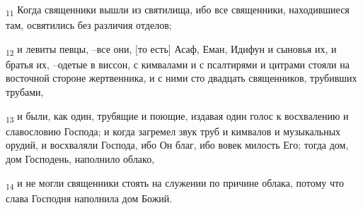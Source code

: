 \begin{tcolorbox}
\textsubscript{11} Когда священники вышли из святилища, ибо все священники, находившиеся там, освятились без различия отделов;
\end{tcolorbox}
\begin{tcolorbox}
\textsubscript{12} и левиты певцы, --все они, [то есть] Асаф, Еман, Идифун и сыновья их, и братья их, --одетые в виссон, с кимвалами и с псалтирями и цитрами стояли на восточной стороне жертвенника, и с ними сто двадцать священников, трубивших трубами,
\end{tcolorbox}
\begin{tcolorbox}
\textsubscript{13} и были, как один, трубящие и поющие, издавая один голос к восхвалению и славословию Господа; и когда загремел звук труб и кимвалов и музыкальных орудий, и восхваляли Господа, ибо Он благ, ибо вовек милость Его; тогда дом, дом Господень, наполнило облако,
\end{tcolorbox}
\begin{tcolorbox}
\textsubscript{14} и не могли священники стоять на служении по причине облака, потому что слава Господня наполнила дом Божий.
\end{tcolorbox}
